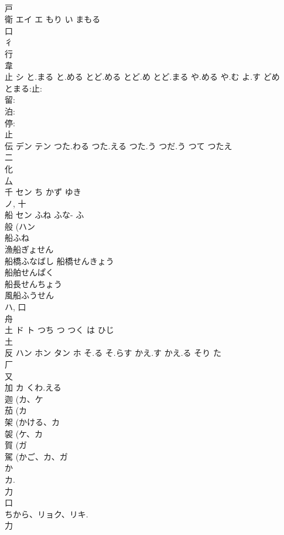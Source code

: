 \documentclass[8pt]{extreport}
\begin{document}
\begin{CJK}{UTF8}{min}
\\	戸 
\\	衛	エイ エ	もり い まもる	
\\	口 
\\	彳 
\\	行 
\\	韋 
\\	止	シ	と.まる と.める とど.める とど.め とど.まる や.める や.む よ.す どめ	
\\	とまる:止: 
\\	留: 
\\	泊: 
\\	停: 
\\	止 
\\	伝	デン テン	つた.わる つた.える つた.う つだ.う つて つたえ	
\\	二 
\\	化 
\\	厶 
\\	千	セン	ち かず ゆき	
\\	ノ, 十 
\\	船	セン	ふね ふな- ふ	
\\	般 (ハン 
\\	船ふね 
\\	漁船ぎょせん 
\\	船橋ふなばし 船橋せんきょう 
\\	船舶せんぱく 
\\	船長せんちょう 
\\	風船ふうせん 
\\	ハ, 口 
\\	舟 
\\	土	ド ト	つち つ つく は ひじ	
\\	土 
\\	反	ハン ホン タン ホ	そ.る そ.らす かえ.す かえ.る そり た	
\\	厂 
\\	又 
\\	加	カ	くわ.える	
\\	迦 (カ、ケ 
\\	茄 (カ 
\\	架 (かける、カ 
\\	袈 (ケ、カ 
\\	賀 (ガ 
\\	駕 (かご、カ、ガ 
\\	か 
\\	カ. 
\\	力 
\\	口 
\\	ちから、リョク、リキ.
\\	力 

\end{CJK}
\end{document}
